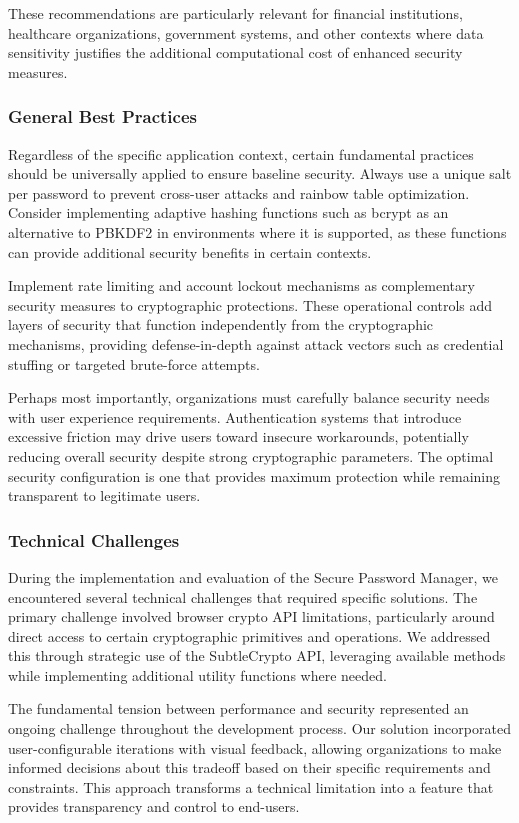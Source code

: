 \documentclass[11pt,a4paper]{article}
\begin{document}
These recommendations are particularly relevant for financial institutions, healthcare organizations, government systems, and other contexts where data sensitivity justifies the additional computational cost of enhanced security measures.
\subsubsection{General Best Practices}
Regardless of the specific application context, certain fundamental practices should be universally applied to ensure baseline security. Always use a unique salt per password to prevent cross-user attacks and rainbow table optimization. Consider implementing adaptive hashing functions such as bcrypt as an alternative to PBKDF2 in environments where it is supported, as these functions can provide additional security benefits in certain contexts.

Implement rate limiting and account lockout mechanisms as complementary security measures to cryptographic protections. These operational controls add layers of security that function independently from the cryptographic mechanisms, providing defense-in-depth against attack vectors such as credential stuffing or targeted brute-force attempts.

Perhaps most importantly, organizations must carefully balance security needs with user experience requirements. Authentication systems that introduce excessive friction may drive users toward insecure workarounds, potentially reducing overall security despite strong cryptographic parameters. The optimal security configuration is one that provides maximum protection while remaining transparent to legitimate users.
\subsubsection{Technical Challenges}
During the implementation and evaluation of the Secure Password Manager, we encountered several technical challenges that required specific solutions. The primary challenge involved browser crypto API limitations, particularly around direct access to certain cryptographic primitives and operations. We addressed this through strategic use of the SubtleCrypto API, leveraging available methods while implementing additional utility functions where needed.

The fundamental tension between performance and security represented an ongoing challenge throughout the development process. Our solution incorporated user-configurable iterations with visual feedback, allowing organizations to make informed decisions about this tradeoff based on their specific requirements and constraints. This approach transforms a technical limitation into a feature that provides transparency and control to end-users.
\end{document}
